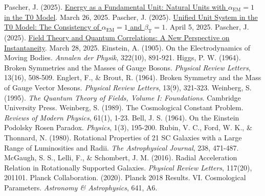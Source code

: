 \documentclass[a4paper,12pt]{article}
\newcommand{\betaT}{\beta_{\text{T}}}
\newcommand{\alphaEM}{\alpha_{\text{EM}}}
\begin{document}
\begin{thebibliography}{99}
		 Pascher, J. (2025). \href{https://github.com/jpascher/T0-Time-Mass-Duality/tree/main/2/pdf/English/NatEinheitenAlpha1En.pdf}{Energy as a Fundamental Unit: Natural Units with $\alphaEM = 1$ in the T0 Model}. March 26, 2025.
		 Pascher, J. (2025). \href{https://github.com/jpascher/T0-Time-Mass-Duality/tree/main/2/pdf/English/Alpha1Beta1KonsistenzEn.pdf}{Unified Unit System in the T0 Model: The Consistency of $\alphaEM = 1$ and $\betaT = 1$}. April 5, 2025.
		 Pascher, J. (2025). \href{https://github.com/jpascher/T0-Time-Mass-Duality/tree/main/2/pdf/English/FeldtheorieQuantenEn.pdf}{Field Theory and Quantum Correlations: A New Perspective on Instantaneity}. March 28, 2025.
		 Einstein, A. (1905). On the Electrodynamics of Moving Bodies. \textit{Annalen der Physik}, 322(10), 891-921.
		 Higgs, P. W. (1964). Broken Symmetries and the Masses of Gauge Bosons. \textit{Physical Review Letters}, 13(16), 508-509.
		 Englert, F., \& Brout, R. (1964). Broken Symmetry and the Mass of Gauge Vector Mesons. \textit{Physical Review Letters}, 13(9), 321-323.
		 Weinberg, S. (1995). \textit{The Quantum Theory of Fields, Volume I: Foundations}. Cambridge University Press.
		 Weinberg, S. (1989). The Cosmological Constant Problem. \textit{Reviews of Modern Physics}, 61(1), 1-23.
		 Bell, J. S. (1964). On the Einstein Podolsky Rosen Paradox. \textit{Physics}, 1(3), 195-200.
		 Rubin, V. C., Ford, W. K., \& Thonnard, N. (1980). Rotational Properties of 21 SC Galaxies with a Large Range of Luminosities and Radii. \textit{The Astrophysical Journal}, 238, 471-487.
		 McGaugh, S. S., Lelli, F., \& Schombert, J. M. (2016). Radial Acceleration Relation in Rotationally Supported Galaxies. \textit{Physical Review Letters}, 117(20), 201101.
		 Planck Collaboration. (2020). Planck 2018 Results. VI. Cosmological Parameters. \textit{Astronomy \& Astrophysics}, 641, A6.
	\end{thebibliography}
	
\end{document}
